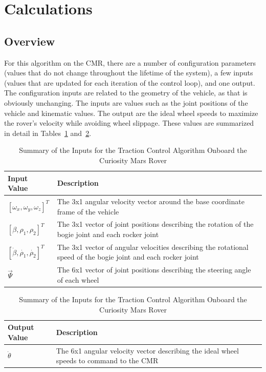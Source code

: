 \section{Calculations}
\subsection{Overview}
For this algorithm on the \ac{CMR}, there are a number of configuration parameters (values that do not change throughout the lifetime of the system), a few inputs (values that are updated for each iteration of the control loop), and one output. The configuration inputs are related to the geometry of the vehicle, as that is obviously unchanging. The inputs are values such as the joint positions of the vehicle and kinematic values. The output are the ideal wheel speeds to maximize the rover's velocity while avoiding wheel slippage. These values are summarized in detail in Tables~\ref{traction_control:algorithms:inputs-cmr} and~\ref{traction_control:algorithms:outputs-cmr}.

\begin{table}[H]
	\centering
	\begin{tabular}{| >{\centering\arraybackslash}m{1.2in} | >{\centering\arraybackslash}m{4.5in} |}
		\hline
		\textbf{Input Value} & \textbf{Description} \\
		\hline
		$\left[\omega_{x}, \omega_{y}, \omega_{z}\right]^{T}$ & The 3x1 angular velocity vector around the base coordinate frame of the vehicle \\
		\hline
		$\left[\beta, \rho_{1}, \rho_{2}\right]^{T}$ & The 3x1 vector of joint positions describing the rotation of the bogie joint and each rocker joint \\
		\hline
		$\left[\dot{\beta}, \dot{\rho_{1}}, \dot{\rho_{2}}\right]^{T}$ & The 3x1 vector of angular velocities describing the rotational speed of the bogie joint and each rocker joint \\
		\hline
		$\vec{\Psi}$ & The 6x1 vector of joint positions describing the steering angle of each wheel \\
		\hline
	\end{tabular}
	\caption{Summary of the Inputs for the Traction Control Algorithm Onboard the Curiosity Mars Rover}
	\label{traction_control:algorithms:inputs-cmr}
\end{table}

\begin{table}[H]
	\centering
	\begin{tabular}{| >{\centering\arraybackslash}m{1.2in} | >{\centering\arraybackslash}m{4.5in} |}
		\hline
		\textbf{Output Value} & \textbf{Description} \\
		\hline
		$\dot{\theta}$ & The 6x1 angular velocity vector describing the ideal wheel speeds to command to the \acl{CMR} \\
		\hline
	\end{tabular}
	\caption{Summary of the Inputs for the Traction Control Algorithm Onboard the Curiosity Mars Rover}
	\label{traction_control:algorithms:outputs-cmr}
\end{table}

